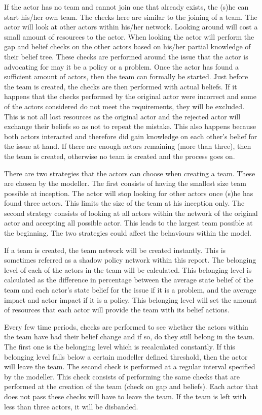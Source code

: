 If the actor has no team and cannot join one that already exists, the (s)he can start his/her own team. The checks here are similar to the joining of a team. The actor will look at other actors within his/her network. Looking around will cost a small amount of resources to the actor. When looking the actor will perform the gap and belief checks on the other actors based on his/her partial knowledge of their belief tree. These checks are performed around the issue that the actor is advocating for may it be a policy or a problem. Once the actor has found a sufficient amount of actors, then the team can formally be started. Just before the team is created, the checks are then performed with actual beliefs. If it happens that the checks performed by the original actor were incorrect and some of the actors considered do not meet the requirements, they will be excluded. This is not all lost resources as the original actor and the rejected actor will exchange their beliefs so as not to repeat the mistake. This also happens because both actors interacted and therefore did gain knowledge on each other's belief for the issue at hand. If there are enough actors remaining (more than three), then the team is created, otherwise no team is created and the process goes on.

There are two strategies that the actors can choose when creating a team. These are chosen by the modeller. The first consists of having the smallest size team possible at inception. The actor will stop looking for other actors once (s)he has found three actors. This limits the size of the team at his inception only. The second strategy consists of looking at all actors within the network of the original actor and accepting all possible actor. This leads to the largest team possible at the beginning. The two strategies could affect the behaviours within the model.

If a team is created, the team network will be created instantly. This is sometimes referred as a shadow policy network within this report. The belonging level of each of the actors in the team will be calculated. This belonging level is calculated as the difference in percentage between the average state belief of the team and each actor's state belief for the issue if it is a problem, and the average impact and actor impact if it is a policy. This belonging level will set the amount of resources that each actor will provide the team with its belief actions.

Every few time periods, checks are performed to see whether the actors within the team have had their belief change and if so, do they still belong in the team. The first one is the belonging level which is recalculated constantly. If this belonging level falls below a certain modeller defined threshold, then the actor will leave the team. The second check is performed at a regular interval specified by the modeller. This check consists of performing the same checks that are performed at the creation of the team (check on gap and beliefs). Each actor that does not pass these checks will have to leave the team. If the team is left with less than three actors, it will be disbanded.

